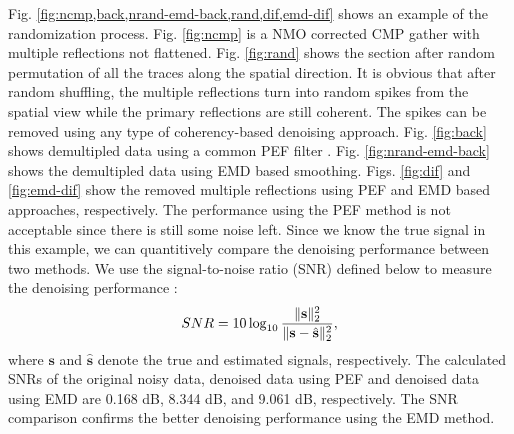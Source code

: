 Fig. \ref{fig:ncmp,back,nrand-emd-back,rand,dif,emd-dif} shows an example of the randomization process. Fig. \ref{fig:ncmp} is a NMO corrected CMP gather with multiple reflections not flattened. Fig.  \ref{fig:rand} shows the section after random permutation of all the traces along the spatial direction. It is obvious that after random shuffling, the multiple reflections turn into random spikes from the spatial view while the primary reflections are still coherent. The spikes can be removed using any type of coherency-based denoising approach. Fig. \ref{fig:back} shows demultipled data using a common PEF filter \cite{Abma1995}. Fig. \ref{fig:nrand-emd-back} shows the demultipled data using EMD based smoothing. Figs. \ref{fig:dif} and \ref{fig:emd-dif} show the removed multiple reflections using PEF and EMD based approaches, respectively. The performance using the PEF method is not acceptable since there is still some noise left. Since we know the true signal in this example, we can quantitively compare the denoising performance between two methods. We use the signal-to-noise ratio (SNR) defined below to measure the denoising performance \cite{yangkang20142,shuwei20153,weilin2016,shaohuan2016}:
\begin{equation}
\label{eq:diff}
SNR=10\log_{10}\frac{\Arrowvert \mathbf{s} \Arrowvert_2^2}{\Arrowvert \mathbf{s} -\hat{\mathbf{s}}\Arrowvert_2^2},
\end{equation}
 where $\mathbf{s}$ and $\hat{\mathbf{s}}$ denote the true and estimated signals, respectively. 
The calculated SNRs of the original noisy data, denoised data using PEF and denoised data using EMD are 0.168 dB, 8.344 dB, and 9.061 dB, respectively. The SNR comparison confirms the better denoising performance using the EMD method.







